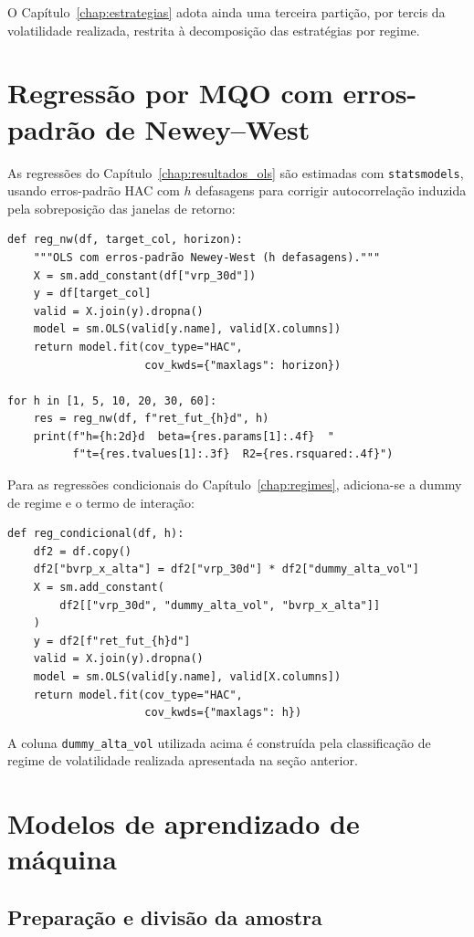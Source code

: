 O Capítulo~\ref{chap:estrategias} adota ainda uma terceira partição, por
tercis da volatilidade realizada, restrita à decomposição das estratégias
por regime.

\section{Regressão por MQO com erros-padrão de Newey--West}

As regressões do Capítulo~\ref{chap:resultados_ols} são estimadas com
\texttt{statsmodels}, usando erros-padrão HAC com $h$ defasagens para corrigir
autocorrelação induzida pela sobreposição das janelas de retorno:

\begin{verbatim}
def reg_nw(df, target_col, horizon):
    """OLS com erros-padrão Newey-West (h defasagens)."""
    X = sm.add_constant(df["vrp_30d"])
    y = df[target_col]
    valid = X.join(y).dropna()
    model = sm.OLS(valid[y.name], valid[X.columns])
    return model.fit(cov_type="HAC",
                     cov_kwds={"maxlags": horizon})

for h in [1, 5, 10, 20, 30, 60]:
    res = reg_nw(df, f"ret_fut_{h}d", h)
    print(f"h={h:2d}d  beta={res.params[1]:.4f}  "
          f"t={res.tvalues[1]:.3f}  R2={res.rsquared:.4f}")
\end{verbatim}

Para as regressões condicionais do Capítulo~\ref{chap:regimes}, adiciona-se a
dummy de regime e o termo de interação:

\begin{verbatim}
def reg_condicional(df, h):
    df2 = df.copy()
    df2["bvrp_x_alta"] = df2["vrp_30d"] * df2["dummy_alta_vol"]
    X = sm.add_constant(
        df2[["vrp_30d", "dummy_alta_vol", "bvrp_x_alta"]]
    )
    y = df2[f"ret_fut_{h}d"]
    valid = X.join(y).dropna()
    model = sm.OLS(valid[y.name], valid[X.columns])
    return model.fit(cov_type="HAC",
                     cov_kwds={"maxlags": h})
\end{verbatim}

A coluna \texttt{dummy\_alta\_vol} utilizada acima é construída pela
classificação de regime de volatilidade realizada apresentada na seção
anterior.

\section{Modelos de aprendizado de máquina}

\subsection{Preparação e divisão da amostra}

